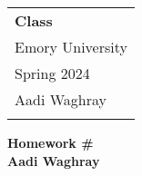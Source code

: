 \documentclass{article}
\begin{document}
\thispagestyle{empty}

\begin{tabular}{p{10.5cm}} 
	{\large \bf Class} \\
	Emory University\\ Spring 2024  \\ Aadi Waghray \\
	\bottomrule 
	\\
\end{tabular}

\vspace*{0.3cm}

\begin{center}
	{\Large \bf Homework \#}\\
	\vspace*{0.02cm}
	{\bf Aadi Waghray}
\end{center}

\vspace{0.4cm}
\end{document}
